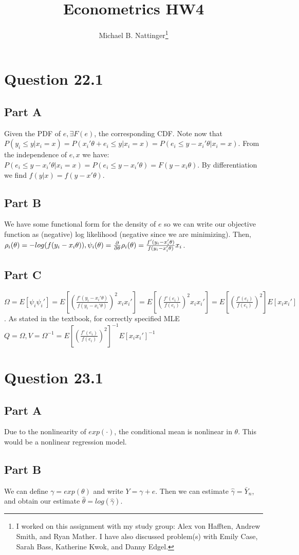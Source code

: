 \documentclass[11pt]{article} %
\title{Econometrics HW4}
\author{Michael B. Nattinger\footnote{I worked on this assignment with my study group: Alex von Hafften, Andrew Smith, and Ryan Mather. I have also discussed problem(s) with Emily Case, Sarah Bass, Katherine Kwok, and Danny Edgel.}}
\begin{document}
\maketitle

\section{Question 22.1}
\subsection{Part A}
Given the PDF of $e, \exists F(e)$, the corresponding CDF. Note now that $P(y_i \leq y | x_i = x) = P(x_i'\theta + e_i \leq y|x_i = x) = P(e_i\leq y-x_i'\theta|x_i = x).$ From the independence of $e,x$ we have: $P(e_i \leq y-x_i'\theta|x_i=x) = P(e_i \leq y-x_i'\theta) = F(y-x_i\theta).$ By differentiation we find $f(y|x) = f(y-x'\theta)$.
\subsection{Part B}
We have some functional form for the density of $e$ so we can write our objective function as (negative) log likelihood (negative since we are minimizing).  Then, $\rho_i(\theta) = - log(f(y_i - x_i\theta)), \\ \psi_i(\theta) = \frac{\partial}{\partial \theta}\rho_i(\theta)  = \frac{f'(y_i - x_i'\theta)}{f(y_i - x_i'\theta)}x_i$.
\subsection{Part C}
$\Omega = E[\psi_i \psi_i'] = E[\left(\frac{f'(y_i - x_i'\theta)}{f(y_i - x_i'\theta)}\right)^2x_ix_i'] = E[\left(\frac{f'(e_i)}{f(e_i)}\right)^2x_ix_i'] = E[\left(\frac{f'(e_i)}{f(e_i)}\right)^2]E[x_ix_i']$. As stated in the textbook, for correctly specified MLE $Q=\Omega, V = \Omega^{-1} = E[\left(\frac{f'(e_i)}{f(e_i)}\right)^2]^{-1}E[x_ix_i']^{-1}$
\section{Question 23.1}
\subsection{Part A}
Due to the nonlinearity of $exp(\cdot )$, the conditional mean is nonlinear in $\theta$. This would be a nonlinear regression model.
\subsection{Part B}
We can define $\gamma = exp(\theta)$ and write $Y=\gamma + e$. Then we can estimate $\hat{\gamma} = \bar{Y}_n$, and obtain our estimate $\hat{\theta} = log(\hat{\gamma}).$
\end{document}
